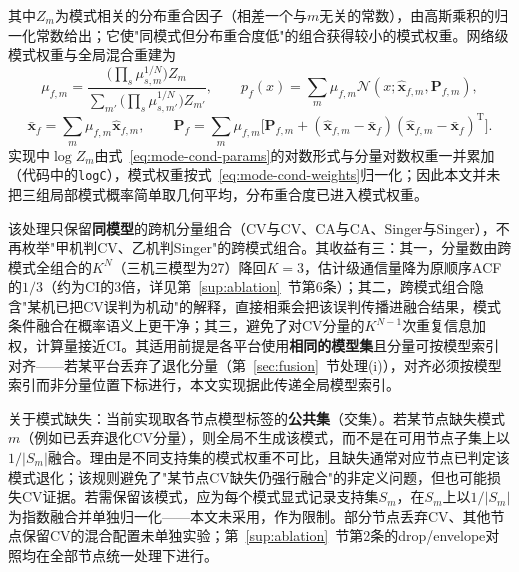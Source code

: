 \documentclass[UTF8,a4paper,zihao=-4]{ctexart}
\begin{document}
其中\(Z_m\)为模式相关的分布重合因子（相差一个与\(m\)无关的常数），由高斯乘积的归一化常数给出；它使"同模式但分布重合度低"的组合获得较小的模式权重。网络级模式权重与全局混合重建为
\begin{equation}
\mu_{f,m}=\frac{\bigl(\prod_{s}\mu_{s,m}^{1/N}\bigr)Z_m}
{\sum_{m'}\bigl(\prod_{s}\mu_{s,m'}^{1/N}\bigr)Z_{m'}},\qquad
p_f(x)=\sum_{m}\mu_{f,m}\mathcal N(x;\hat{\boldsymbol x}_{f,m},\boldsymbol P_{f,m}),
\label{eq:mode-cond-weights}
\end{equation}
\begin{equation}
\bar{\boldsymbol x}_f=\sum_m\mu_{f,m}\hat{\boldsymbol x}_{f,m},\qquad
\boldsymbol P_f=\sum_m\mu_{f,m}\bigl[\boldsymbol P_{f,m}+(\hat{\boldsymbol x}_{f,m}-\bar{\boldsymbol x}_f)(\hat{\boldsymbol x}_{f,m}-\bar{\boldsymbol x}_f)^{\mathrm T}\bigr].
\label{eq:mode-cond-global}
\end{equation}
实现中\(\log Z_m\)由式~\eqref{eq:mode-cond-params}的对数形式与分量对数权重一并累加（代码中的\texttt{logC}），模式权重按式~\eqref{eq:mode-cond-weights}归一化；因此本文并未把三组局部模式概率简单取几何平均，分布重合度已进入模式权重。

该处理只保留\textbf{同模型}的跨机分量组合（CV与CV、CA与CA、Singer与Singer），不再枚举"甲机判CV、乙机判Singer"的跨模式组合。其收益有三：其一，分量数由跨模式全组合的\(K^N\)（三机三模型为27）降回\(K=3\)，估计级通信量降为原顺序ACF的\(1/3\)（约为CI的3倍，详见第~\ref{sup:ablation}~节第6条）；其二，跨模式组合隐含"某机已把CV误判为机动"的解释，直接相乘会把该误判传播进融合结果，模式条件融合在概率语义上更干净；其三，避免了对CV分量的\(K^{N-1}\)次重复信息加权，计算量接近CI。其适用前提是各平台使用\textbf{相同的模型集}且分量可按模型索引对齐——若某平台丢弃了退化分量（第~\ref{sec:fusion}~节处理(i)），对齐必须按模型索引而非分量位置下标进行，本文实现据此传递全局模型索引。

关于模式缺失：当前实现取各节点模型标签的\textbf{公共集}（交集）。若某节点缺失模式\(m\)（例如已丢弃退化CV分量），则全局不生成该模式，而不是在可用节点子集上以\(1/|S_m|\)融合。理由是不同支持集的模式权重不可比，且缺失通常对应节点已判定该模式退化；该规则避免了"某节点CV缺失仍强行融合"的非定义问题，但也可能损失CV证据。若需保留该模式，应为每个模式显式记录支持集\(S_m\)，在\(S_m\)上以\(1/|S_m|\)为指数融合并单独归一化——本文未采用，作为限制。部分节点丢弃CV、其他节点保留CV的混合配置未单独实验；第~\ref{sup:ablation}~节第2条的drop/envelope对照均在全部节点统一处理下进行。
\end{document}
